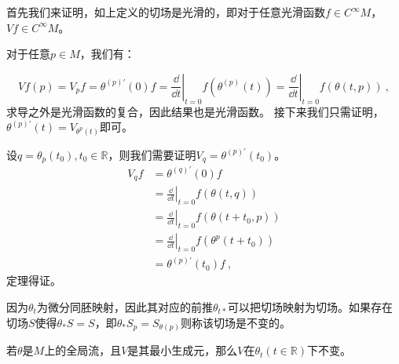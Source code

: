 首先我们来证明，如上定义的切场是光滑的，即对于任意光滑函数$f\in C^{\infty}M$，$Vf\in C^{\infty}M$。

对于任意$p\in M$，我们有：

\begin{equation}
Vf(p)=V_pf=\theta^{(p)\prime}(0)f=\left.\frac{\dd}{\dd t}\right|_{t=0} f\left(\theta^{(p)}(t)\right)=\left.\frac{\dd}{\dd t}\right|_{t=0} f(\theta(t, p)) ~,
\end{equation}
求导之外是光滑函数的复合，因此结果也是光滑函数。
接下来我们只需证明，$\theta^{(p) \prime}(t)=V_{\theta^{p}(t)}$即可。

设$q=\theta_p(t_0),t_0\in \mathbb R$，则我们需要证明$V_q=\theta^{(p)\prime}(t_0)$。
\begin{equation}
\begin{aligned}
V_qf&=\theta^{(q)\prime}(0)f\\
&=\left.\frac{\dd}{\dd t}\right|_{t=0} f(\theta(t, q))\\
&=\left.\frac{\dd}{\dd t}\right|_{t=0} f(\theta(t+t_0, p))\\
&=\left.\frac{\dd}{\dd t}\right|_{t=0} f(\theta^p(t+t_0))\\
&=\theta^{(p)\prime}(t_0)f~,
\end{aligned}
\end{equation}
定理得证。

因为$\theta_t$为微分同胚映射，因此其对应的前推$\theta_{t*}$可以把切场映射为切场。如果存在切场$S$使得$\theta_*S=S$，即$\theta_*S_p=S_{\theta(p)}
$则称该切场是不变的。

\begin{theorem}{}
若$\theta$是$M$上的全局流，且$V$是其最小生成元，那么$V$在$\theta_t(t\in \mathbb R)$下不变。
\end{theorem}
\text
